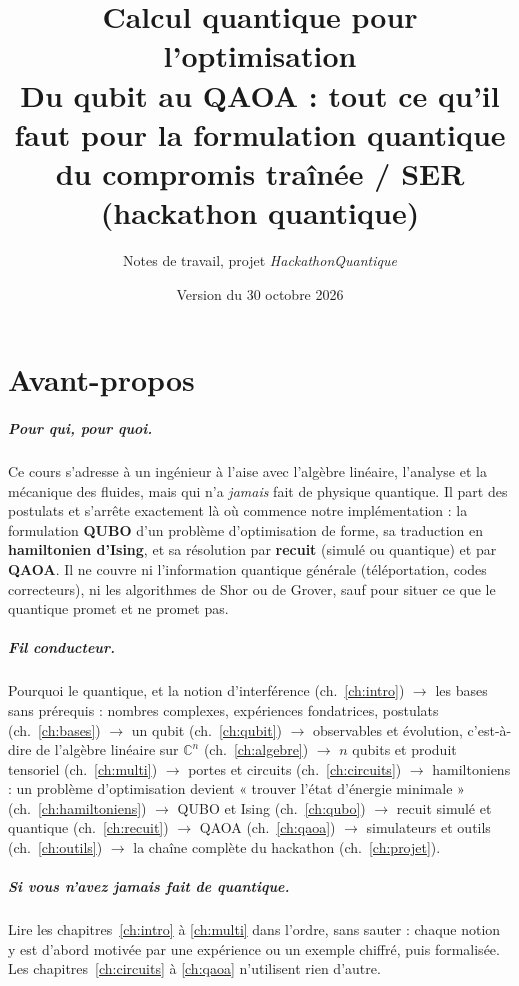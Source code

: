 \documentclass[11pt,a4paper]{report}
\title{\textbf{Calcul quantique pour l'optimisation}\\[0.4em]\large Du qubit au QAOA : tout ce qu'il faut pour la formulation quantique\\ du compromis traînée / SER (hackathon quantique)}
\author{Notes de travail, projet \emph{HackathonQuantique}}
\date{Version du 30 octobre 2026}
\newcommand{\C}{\mathbb{C}}
\begin{document}
\maketitle
{}

\chapter*{Avant-propos}
\paragraph{Pour qui, pour quoi.} Ce cours s'adresse à un ingénieur à l'aise avec l'algèbre linéaire, l'analyse et la mécanique des fluides, mais qui n'a \emph{jamais} fait de physique quantique. Il part des postulats et s'arrête exactement là où commence notre implémentation : la formulation \textbf{QUBO} d'un problème d'optimisation de forme, sa traduction en \textbf{hamiltonien d'Ising}, et sa résolution par \textbf{recuit} (simulé ou quantique) et par \textbf{QAOA}. Il ne couvre ni l'information quantique générale (téléportation, codes correcteurs), ni les algorithmes de Shor ou de Grover, sauf pour situer ce que le quantique promet et ne promet pas.

\paragraph{Fil conducteur.} Pourquoi le quantique, et la notion d'interférence (ch.~\ref{ch:intro}) $\to$ les bases sans prérequis : nombres complexes, expériences fondatrices, postulats (ch.~\ref{ch:bases}) $\to$ un qubit (ch.~\ref{ch:qubit}) $\to$ observables et évolution, c'est-à-dire de l'algèbre linéaire sur $\C^n$ (ch.~\ref{ch:algebre}) $\to$ $n$ qubits et produit tensoriel (ch.~\ref{ch:multi}) $\to$ portes et circuits (ch.~\ref{ch:circuits}) $\to$ hamiltoniens : un problème d'optimisation devient « trouver l'état d'énergie minimale » (ch.~\ref{ch:hamiltoniens}) $\to$ QUBO et Ising (ch.~\ref{ch:qubo}) $\to$ recuit simulé et quantique (ch.~\ref{ch:recuit}) $\to$ QAOA (ch.~\ref{ch:qaoa}) $\to$ simulateurs et outils (ch.~\ref{ch:outils}) $\to$ la chaîne complète du hackathon (ch.~\ref{ch:projet}).

\paragraph{Si vous n'avez jamais fait de quantique.} Lire les chapitres~\ref{ch:intro} à \ref{ch:multi} dans l'ordre, sans sauter : chaque notion y est d'abord motivée par une expérience ou un exemple chiffré, puis formalisée. Les chapitres~\ref{ch:circuits} à \ref{ch:qaoa} n'utilisent rien d'autre.
\end{document}
